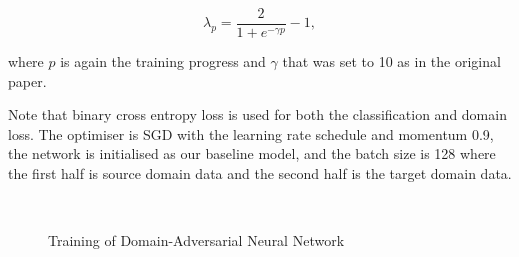 \begin{equation}
	\lambda_p = \frac{2}{1 + e^{-\gamma p}} - 1,
\end{equation}

where \(p\) is again the training progress
and \(\gamma\) that was set to 10 as in the original paper.

Note that binary cross entropy loss is used for both the classification and domain loss.
The optimiser is SGD with the learning rate schedule and momentum 0.9,
the network is initialised as our baseline model,
and the batch size is 128
where the first half is source domain data and the second half is the target domain data.

\begin{figure}
\begin{center}
\\
\end{center}
\caption{Training of Domain-Adversarial Neural Network}
\label{dann_training}
\end{figure}

